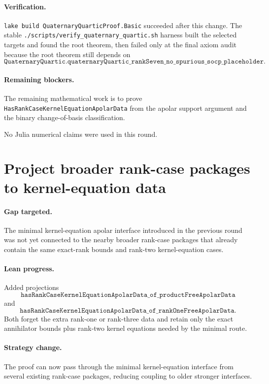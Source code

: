 \documentclass[11pt]{article}
\begin{document}
\paragraph{Verification.}
\texttt{lake build QuaternaryQuarticProof.Basic} succeeded after this change.
The stable \texttt{./scripts/verify\_quaternary\_quartic.sh} harness built the
selected targets and found the root theorem, then failed only at the final axiom
audit because the root theorem still depends on
\[
\texttt{QuaternaryQuartic.quaternaryQuartic\_rankSeven\_no\_spurious\_socp\_placeholder}.
\]

\paragraph{Remaining blockers.}
The remaining mathematical work is to prove
\texttt{HasRankCaseKernelEquationApolarData} from the apolar support argument
and the binary change-of-basis classification.

No Julia numerical claims were used in this round.

\section*{Project broader rank-case packages to kernel-equation data}

\paragraph{Gap targeted.}
The minimal kernel-equation apolar interface introduced in the previous round
was not yet connected to the nearby broader rank-case packages that already
contain the same exact-rank bounds and rank-two kernel-equation cases.

\paragraph{Lean progress.}
Added projections
\[
\texttt{hasRankCaseKernelEquationApolarData\_of\_productFreeApolarData}
\]
and
\[
\texttt{hasRankCaseKernelEquationApolarData\_of\_rankOneFreeApolarData}.
\]
Both forget the extra rank-one or rank-three data and retain only the exact
annihilator bounds plus rank-two kernel equations needed by the minimal route.

\paragraph{Strategy change.}
The proof can now pass through the minimal kernel-equation interface from
several existing rank-case packages, reducing coupling to older stronger
interfaces.
\end{document}
